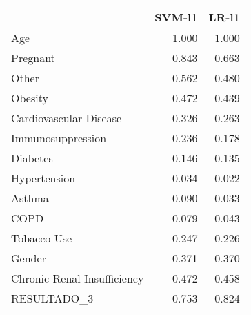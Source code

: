 \begin{tabular}{lrr}
\toprule
{} &  SVM-l1 &  LR-l1 \\
\midrule
Age                         &   1.000 &  1.000 \\
Pregnant                    &   0.843 &  0.663 \\
Other                       &   0.562 &  0.480 \\
Obesity                     &   0.472 &  0.439 \\
Cardiovascular Disease      &   0.326 &  0.263 \\
Immunosuppression           &   0.236 &  0.178 \\
Diabetes                    &   0.146 &  0.135 \\
Hypertension                &   0.034 &  0.022 \\
Asthma                      &  -0.090 & -0.033 \\
COPD                        &  -0.079 & -0.043 \\
Tobacco Use                 &  -0.247 & -0.226 \\
Gender                      &  -0.371 & -0.370 \\
Chronic Renal Insufficiency &  -0.472 & -0.458 \\
RESULTADO\_3                 &  -0.753 & -0.824 \\
\bottomrule
\end{tabular}
